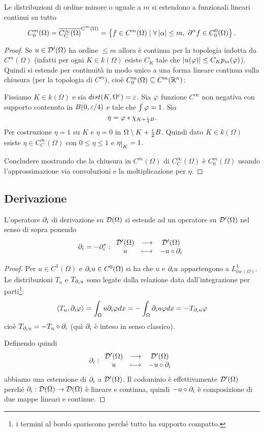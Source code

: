 \begin{proposition}\label{PrDistribuzioniDiOrdineFinitoSiEstendonoAFunzionaliContinuiSuRegolariNulleAlBordo}
Le distribuzioni di ordine minore o uguale a $m$ si estendono a funzionali lineari continui su tutto 
\[C^m_0(\Omega)=\overline{C^\infty_C(\Omega)}^{C^m(\Omega)}=\left\{{f\in C^m(\Omega)\mid \forall \left|{\alpha}\right|\leq m,\ \partial^\alpha f\in C^0_0(\Omega)}\right\}.\]
\end{proposition}
\begin{proof}
Se $u\in \mathcal{D}'(\Omega)$ ha ordine $\leq m$ allora \`e continua per la topologia indotta da $C^m(\Omega)$ (infatti per ogni $K\in k(\Omega)$ esiste $C_K$ tale che $\left|{u(\varphi)}\right|\leq C_Kp_m(\varphi)$). Quindi si estende per continuit\`a in modo unico a una forma lineare continua sulla chiusura (per la topologia di $C^m$), cio\`e $C^m_0(\Omega)\subseteq C^m(\mathbb{R}^n)$:

Fissiamo $K\in k(\Omega)$ e sia $dist(K,\Omega^c)=\varepsilon$. Sia $\varphi$ funzione $C^\infty$ non negativa con supporto contenuto in $B(0,\varepsilon/4)$ e tale che $\int \varphi=1$. Sia 
\[\eta=\varphi\ast\chi_{K+\frac{\varepsilon}4B}.\]
Per costruzione $\eta=1$ su $K$ e $\eta=0$ in $\Omega\setminus K+\frac{\varepsilon}2 B$.
Quindi dato $K\in k(\Omega)$ esiste $\eta\in C^\infty_C(\Omega)$ con $0\leq \eta\leq 1$ e $\eta\res K=1$.


Concludere mostrando che la chiusura in $C^m(\Omega)$ di $C_C^\infty(\Omega)$ \`e $C^m_0(\Omega)$ usando l'approssimazione via convoluzioni e la moltiplicazione per $\eta$.
\end{proof}

\subsection{Derivazione}
\begin{proposition}
L'operatore $\partial_i$ di derivazione su $\mathcal{D}(\Omega)$ si estende ad un operatore su $\mathcal{D}'(\Omega)$ nel senso di sopra ponendo
\[\partial_i=-\partial_i^\ast:\begin{array}{ccc} {\mathcal{D}'(\Omega)} & \longrightarrow & {\mathcal{D}'(\Omega)}\\ {u} & \longmapsto & {-u\circ \partial_i} \end{array}\]
\end{proposition}
\begin{proof}
Per $u\in C^1(\Omega)$ e $\partial_i u\in C^0(\Omega)$ si ha che $u$ e $\partial_i u$ appartengono a $L^1_{loc(\Omega)}$. Le distribuzioni $T_u$ e $T_{\partial_i u}$ sono legate dalla relazione data dall'integrazione per parti\footnote{i termini al bordo spariscono perch\'e tutto ha supporto compatto.}:
\[\left\langle {T_u,\partial_i\varphi}\right\rangle=\int_\Omega u\partial_i\varphi dx=-\int_\Omega\partial_i u\varphi dx=-T_{\partial_i u} \varphi\]
cio\`e $T_{\partial_iu}=-T_u\circ \partial_i$ (qu\`i $\partial_i$ \`e inteso in senso classico).
\smallskip

\noindent
Definendo quindi
\[\partial_i:\begin{array}{ccc} {\mathcal{D}'(\Omega)} & \longrightarrow & {\mathcal{D}'(\Omega)}\\ {u} & \longmapsto & {-u\circ \partial_i} \end{array}\]
abbiamo una estensione di $\partial_i$ a $\mathcal{D}'(\Omega)$. Il codominio \`e effettivamente $\mathcal{D}'(\Omega)$ perch\'e $\partial_i:\mathcal{D}(\Omega)\to\mathcal{D}(\Omega)$ \`e lineare e continua, quindi $-u\circ \partial_i$ \`e composizione di due mappe lineari e continue.
\end{proof}




